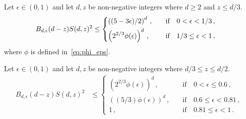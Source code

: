 


\begin{claim}\label{claim:t1star-variance-exact}
  Let $\epsilon \in (0,1)$ and 
  let $d,z$ be non-negative integers where $d \geq 2$ and $z \leq d/3$. 
  \begin{align*}
    B_{d, \epsilon}(d-z) S(d,z)^2
    &\leq \begin{dcases} 
    \left( (5-3 \epsilon)/2 \right)^d \,,
        &\quad \text{if}\quad
        0 < \epsilon < 1/3 \,, \\
    \left( 2^{2/3} \phi(\epsilon) \right)^d \,,
        &\quad \text{if}\quad
        1/3 \leq \epsilon < 1 \, ,
    \end{dcases}
  \end{align*}
  where $\phi$ is defined in~\eqref{eq:phi_eps}.
\end{claim}

\begin{claim}\label{claim:t2star-variance-exact}
  Let $\epsilon \in (0,1)$ and 
  let $d,z$ be non-negative integers where $d/3 \leq z \leq d/2$. 
  \begin{align*}
    B_{d, \epsilon}(d-z) S(d,z)^2
    &\leq \begin{cases} 
    \left( 2^{2/3} \phi(\epsilon) \right)^d \,,
        &\quad\text{if}\quad 0 < \epsilon \leq 0.6\,, \\
    \left( (5/3) \phi(\epsilon)  \right)^d \,,
        &\quad\text{if}\quad 0.6\leq \epsilon < 0.81\,, \\
    1 \,,
        &\quad\text{if}\quad 0.81 \leq \epsilon < 1
        \,.
    \end{cases}
  \end{align*}
\end{claim}


